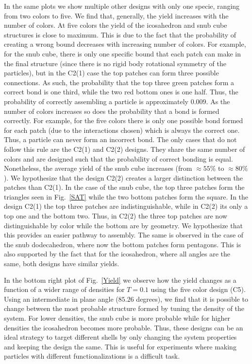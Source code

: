 \documentclass[a4paper, amsfonts, amssymb, amsmath, reprint, showkeys, nofootinbib, twoside]{revtex4-1}
\begin{document}
In the same plots we show multiple other designs with only one specie, ranging from two colors to five. We find that, generally, the yield increases with the number of colors. At five colors the yield of the icosahedron and snub cube structures is close to maximum. This is due to the fact that the probability of creating a wrong bound decreases with increasing number of colors. For example, for the snub cube, there is only one specific bound that each patch can make in the final structure (since there is no rigid body rotational symmetry of the particles), but in the C2(1) case the top patches can form three possible connections. As such, the probability that the top three green patches form a correct bond is one third, while the two red bottom ones is one half. Thus, the probability of correctly assembling a particle is approximately $0.009$. As the number of colors increases so does the probability that a bond is formed correctly. For example, for the five colors there is only one possible bond formed for each patch (due to the interactions chosen) which is always the correct one. Thus, a particle can never form an incorrect bond. The only cases that do not follow this rule are the C2(1) and C2(2) designs. They share the same number of colors and are designed such that the probability of correct bonding is equal. Nonetheless, the average yield of the snub cube increases (from $\approx55\%$ to $\approx80\%$). We hypothesize that the design C2(2) creates a larger distinction between the patches than C2(1). In the case of the snub cube, the top three patches form the triangles seen in Fig.~\ref{SAT} while the two bottom patches form the square. In the design C2(1) the top three patches are indistinguishable, while in C2(2) its only a top one and the bottom two. Thus, in C2(2) the three top patches are now distinguishable by color while the bottom are by geometry. We hypothesize that this provides an easier pathway to assembly. The same is observed in the case of the snub dodecahedron, where now the bottom patches form pentagons. This is also supported by the fact that for the icosahedron, where all angles are the same, both designs have similar yields.

In the bottom right plot of Fig.~\ref{Yield} we observe how the yield changes as a function of a wider range of densities for $T=0.1$ using the five color design (C5). Using an intermediate in plane angle ($85.26$ degrees), we find that it is possible to change between the most probable structure formed by tuning the density of the system. For lower densities, the snub cube is more probable while for higher densities the icosahedron becomes more probable. Thus, these designs can be an ideal strategy to target different shells by only changing the system properties and keeping the design the same. This is useful for experiments where making particles with different functionalizations is a difficult task.
\end{document}
